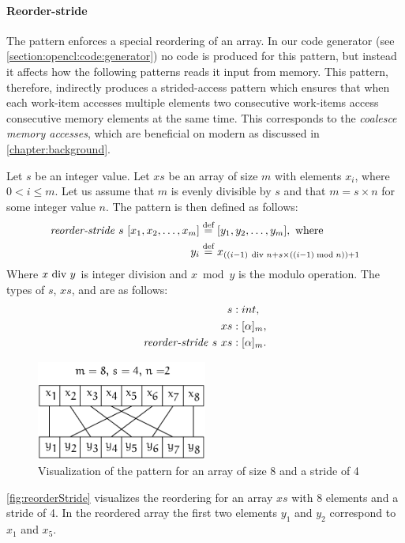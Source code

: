 \paragraph{Reorder-stride}
The \reorderStride pattern enforces a special reordering of an array.
In our code generator (see \autoref{section:opencl:code:generator}) no code is produced for this pattern, but instead it affects how the following patterns reads it input from memory.
This pattern, therefore, indirectly produces a strided-access pattern which ensures that when each work-item accesses multiple elements two consecutive work-items access consecutive memory elements at the same time.
This corresponds to the \emph{coalesce memory accesses}, which are beneficial on modern \GPUs as discussed in \autoref{chapter:background}.
\begin{definition}
  \label{definition:pattern:reorderStride}
  Let $s$ be an integer value.
  Let $xs$ be an array of size $m$ with elements $x_i$, where $0 < i \leq m$.
  Let us assume that $m$ is evenly divisible by $s$ and that $m = s\times n$ for some integer value $n$.
  The \reorderStride pattern is then defined as follows:
  \begin{align*}
    \text{\textit{reorder-stride}}\ s\ [x_1, x_2, \dots, x_m] &\stackrel{\textrm{\scriptsize def}}{=} [y_1, y_2, \dots, y_m], \text{ where}\\
    y_i &\stackrel{\textrm{\scriptsize def}}{=} x_{((i-1)\ \text{\normalfont div } n + s \times ((i-1) \bmod{n}))+1}
  \end{align*}
  Where $x\ \text{\normalfont div}\ y$ is integer division and $x \bmod{y}$ is the modulo operation.
  The types of $s$, $xs$, and \reorderStride are as follows:
  \begin{align*}
    s &: int,\\
    xs &: [\alpha]_m,\\
    \text{\textit{reorder-stride}}\ s\ xs &: [\alpha]_m .
  \end{align*}
\end{definition}

\begin{figure}
  \centering
  \includegraphics[width=0.5\textwidth]{Figures/Reorder.pdf}
  \caption[Visualization of the \reorderStride pattern]{Visualization of the \reorderStride pattern for an array of size 8 and a stride of 4}
  \label{fig:reorderStride}
\end{figure}
\autoref{fig:reorderStride} visualizes the reordering for an array $xs$ with 8 elements and a stride of 4.
In the reordered array the first two elements $y_1$ and $y_2$ correspond to $x_1$ and $x_5$.


